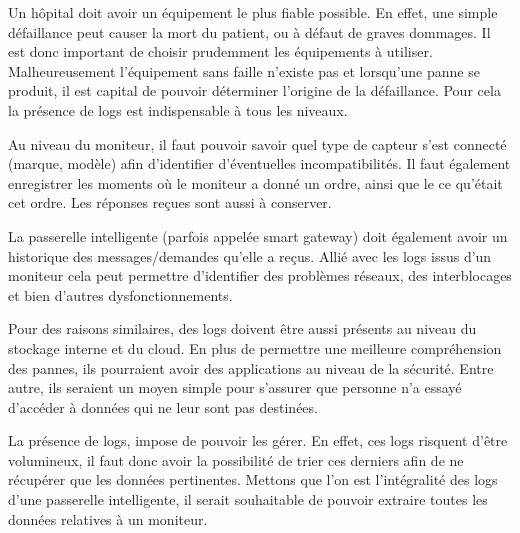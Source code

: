 Un hôpital doit avoir un équipement le plus fiable possible. En effet, une simple défaillance peut causer la mort du patient, ou
à défaut de graves dommages. Il est donc important de choisir prudemment les équipements à utiliser. Malheureusement l'équipement
sans faille n'existe pas et lorsqu'une panne se produit, il est capital de pouvoir déterminer l'origine de la défaillance. Pour
cela la présence de logs est indispensable à tous les niveaux. 
\newline

Au niveau du moniteur, il faut pouvoir savoir quel type de capteur s'est connecté (marque, modèle) afin d'identifier d'éventuelles
incompatibilités. Il faut également enregistrer les moments où le moniteur a donné un ordre, ainsi que le ce qu'était cet ordre.
Les réponses reçues sont aussi à conserver.
\newline

La passerelle intelligente (parfois appelée smart gateway) doit également avoir un historique des messages/demandes qu'elle a
reçus. Allié avec les logs issus d'un moniteur cela peut permettre d'identifier des problèmes réseaux, des interblocages et bien
d'autres dysfonctionnements.
\newline 

Pour des raisons similaires, des logs doivent être aussi présents au niveau du stockage interne et du cloud. En plus de permettre
une meilleure compréhension des pannes, ils pourraient avoir des applications au niveau de la sécurité. Entre autre, ils seraient
un moyen simple pour s'assurer que personne n'a essayé d'accéder à données qui ne leur sont pas destinées.
\newline

La présence de logs, impose de pouvoir les gérer. En effet, ces logs risquent d'être volumineux, il faut donc avoir la
possibilité de trier ces derniers afin de ne récupérer que les données pertinentes. Mettons que l'on est l'intégralité des logs
d'une passerelle intelligente, il serait souhaitable de pouvoir extraire toutes les données relatives à un moniteur.
